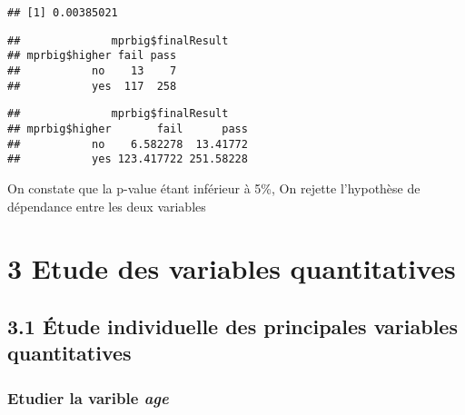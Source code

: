 \documentclass[
]{article}
\newenvironment{Shaded}{\begin{snugshade}}{\end{snugshade}}
\newcommand{\CommentTok}[1]{\textcolor[rgb]{0.56,0.35,0.01}{\textit{#1}}}
\newcommand{\NormalTok}[1]{#1}
\newcommand{\OperatorTok}[1]{\textcolor[rgb]{0.81,0.36,0.00}{\textbf{#1}}}
\begin{document}
\begin{verbatim}
## [1] 0.00385021
\end{verbatim}

\begin{Shaded}
\end{Shaded}

\begin{verbatim}
##              mprbig$finalResult
## mprbig$higher fail pass
##           no    13    7
##           yes  117  258
\end{verbatim}

\begin{Shaded}
\end{Shaded}

\begin{verbatim}
##              mprbig$finalResult
## mprbig$higher       fail      pass
##           no    6.582278  13.41772
##           yes 123.417722 251.58228
\end{verbatim}

On constate que la p-value étant inférieur à 5\%, On rejette l'hypothèse
de dépendance entre les deux variables

\hypertarget{etude-des-variables-quantitatives}{%
\section{3 Etude des variables
quantitatives}\label{etude-des-variables-quantitatives}}

\hypertarget{uxe9tude-individuelle-des-principales-variables-quantitatives}{%
\subsection{3.1 Étude individuelle des principales variables
quantitatives}\label{uxe9tude-individuelle-des-principales-variables-quantitatives}}

\hypertarget{etudier-la-varible-age}{%
\subsubsection{\texorpdfstring{Etudier la varible
\textbf{\emph{age}}}{Etudier la varible age}}\label{etudier-la-varible-age}}
\end{document}
